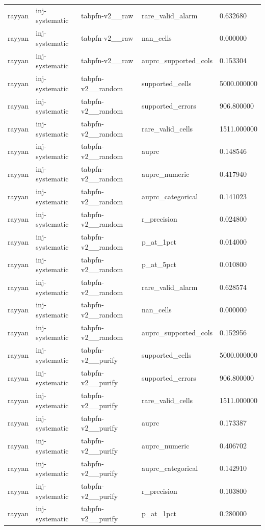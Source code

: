 \begin{tabular}{lllll}
rayyan & inj-systematic & tabpfn-v2\_\_raw & rare\_valid\_alarm & 0.632680 \\
rayyan & inj-systematic & tabpfn-v2\_\_raw & nan\_cells & 0.000000 \\
rayyan & inj-systematic & tabpfn-v2\_\_raw & auprc\_supported\_cols & 0.153304 \\
rayyan & inj-systematic & tabpfn-v2\_\_random & supported\_cells & 5000.000000 \\
rayyan & inj-systematic & tabpfn-v2\_\_random & supported\_errors & 906.800000 \\
rayyan & inj-systematic & tabpfn-v2\_\_random & rare\_valid\_cells & 1511.000000 \\
rayyan & inj-systematic & tabpfn-v2\_\_random & auprc & 0.148546 \\
rayyan & inj-systematic & tabpfn-v2\_\_random & auprc\_numeric & 0.417940 \\
rayyan & inj-systematic & tabpfn-v2\_\_random & auprc\_categorical & 0.141023 \\
rayyan & inj-systematic & tabpfn-v2\_\_random & r\_precision & 0.024800 \\
rayyan & inj-systematic & tabpfn-v2\_\_random & p\_at\_1pct & 0.014000 \\
rayyan & inj-systematic & tabpfn-v2\_\_random & p\_at\_5pct & 0.010800 \\
rayyan & inj-systematic & tabpfn-v2\_\_random & rare\_valid\_alarm & 0.628574 \\
rayyan & inj-systematic & tabpfn-v2\_\_random & nan\_cells & 0.000000 \\
rayyan & inj-systematic & tabpfn-v2\_\_random & auprc\_supported\_cols & 0.152956 \\
rayyan & inj-systematic & tabpfn-v2\_\_purify & supported\_cells & 5000.000000 \\
rayyan & inj-systematic & tabpfn-v2\_\_purify & supported\_errors & 906.800000 \\
rayyan & inj-systematic & tabpfn-v2\_\_purify & rare\_valid\_cells & 1511.000000 \\
rayyan & inj-systematic & tabpfn-v2\_\_purify & auprc & 0.173387 \\
rayyan & inj-systematic & tabpfn-v2\_\_purify & auprc\_numeric & 0.406702 \\
rayyan & inj-systematic & tabpfn-v2\_\_purify & auprc\_categorical & 0.142910 \\
rayyan & inj-systematic & tabpfn-v2\_\_purify & r\_precision & 0.103800 \\
rayyan & inj-systematic & tabpfn-v2\_\_purify & p\_at\_1pct & 0.280000 \\

\end{tabular}
